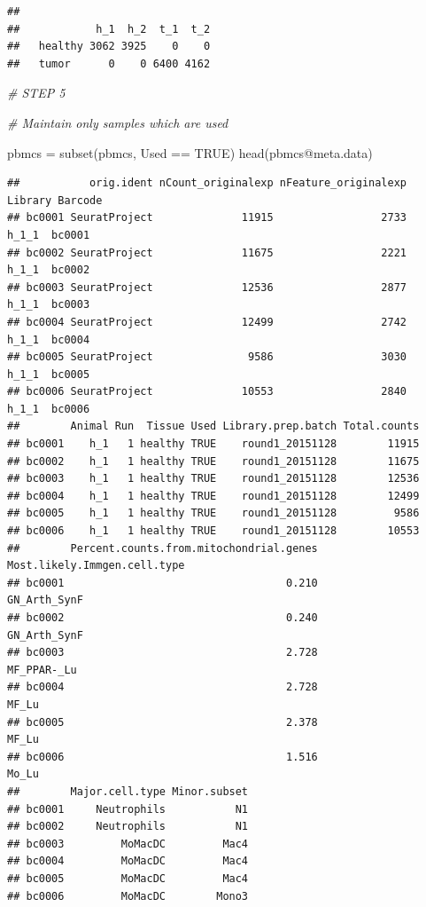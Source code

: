 \documentclass[
]{article}
\newenvironment{Shaded}{\begin{snugshade}}{\end{snugshade}}
\newcommand{\CommentTok}[1]{\textcolor[rgb]{0.56,0.35,0.01}{\textit{#1}}}
\newcommand{\ConstantTok}[1]{\textcolor[rgb]{0.00,0.00,0.00}{#1}}
\newcommand{\FunctionTok}[1]{\textcolor[rgb]{0.00,0.00,0.00}{#1}}
\newcommand{\NormalTok}[1]{#1}
\newcommand{\OtherTok}[1]{\textcolor[rgb]{0.56,0.35,0.01}{#1}}
\newcommand{\SpecialCharTok}[1]{\textcolor[rgb]{0.00,0.00,0.00}{#1}}
\begin{document}
\begin{verbatim}
##          
##            h_1  h_2  t_1  t_2
##   healthy 3062 3925    0    0
##   tumor      0    0 6400 4162
\end{verbatim}

\begin{Shaded}
\begin{Highlighting}[]
\CommentTok{\# STEP 5}

\CommentTok{\# Maintain only samples which are used }

\NormalTok{pbmcs }\OtherTok{=} \FunctionTok{subset}\NormalTok{(pbmcs, Used }\SpecialCharTok{==} \ConstantTok{TRUE}\NormalTok{)}
\FunctionTok{head}\NormalTok{(pbmcs}\SpecialCharTok{@}\NormalTok{meta.data)}
\end{Highlighting}
\end{Shaded}

\begin{verbatim}
##           orig.ident nCount_originalexp nFeature_originalexp Library Barcode
## bc0001 SeuratProject              11915                 2733   h_1_1  bc0001
## bc0002 SeuratProject              11675                 2221   h_1_1  bc0002
## bc0003 SeuratProject              12536                 2877   h_1_1  bc0003
## bc0004 SeuratProject              12499                 2742   h_1_1  bc0004
## bc0005 SeuratProject               9586                 3030   h_1_1  bc0005
## bc0006 SeuratProject              10553                 2840   h_1_1  bc0006
##        Animal Run  Tissue Used Library.prep.batch Total.counts
## bc0001    h_1   1 healthy TRUE    round1_20151128        11915
## bc0002    h_1   1 healthy TRUE    round1_20151128        11675
## bc0003    h_1   1 healthy TRUE    round1_20151128        12536
## bc0004    h_1   1 healthy TRUE    round1_20151128        12499
## bc0005    h_1   1 healthy TRUE    round1_20151128         9586
## bc0006    h_1   1 healthy TRUE    round1_20151128        10553
##        Percent.counts.from.mitochondrial.genes Most.likely.Immgen.cell.type
## bc0001                                   0.210                 GN_Arth_SynF
## bc0002                                   0.240                 GN_Arth_SynF
## bc0003                                   2.728                  MF_PPAR-_Lu
## bc0004                                   2.728                        MF_Lu
## bc0005                                   2.378                        MF_Lu
## bc0006                                   1.516                        Mo_Lu
##        Major.cell.type Minor.subset
## bc0001     Neutrophils           N1
## bc0002     Neutrophils           N1
## bc0003         MoMacDC         Mac4
## bc0004         MoMacDC         Mac4
## bc0005         MoMacDC         Mac4
## bc0006         MoMacDC        Mono3
\end{verbatim}
\end{document}
